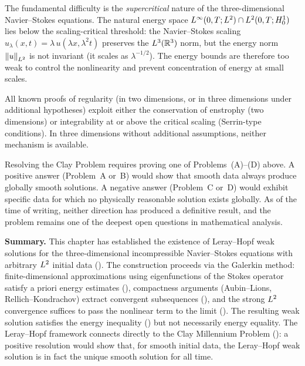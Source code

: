 \begin{remark}\label{rem:the-gap}
  The fundamental difficulty is the \emph{supercritical} nature of the three-dimensional
  Navier--Stokes equations.  The natural energy space
  $L^{\infty}(0, T; L^{2}) \cap L^{2}(0, T; H^{1}_0)$ lies below the
  scaling-critical threshold: the Navier--Stokes scaling
  $u_{\lambda}(x, t) = \lambda\,u(\lambda x, \lambda^{2} t)$ preserves the
  $L^{3}(\mathbb{R}^{3})$ norm, but the energy norm $\left\lVert u \right\rVert_{L^{2}}$ is not invariant
  (it scales as $\lambda^{-1/2}$).  The energy bounds are therefore too weak to control
  the nonlinearity and prevent concentration of energy at small scales.

  All known proofs of regularity (in two dimensions, or in three dimensions under
  additional hypotheses) exploit either the conservation of enstrophy (two dimensions) or
  integrability at or above the critical scaling (Serrin-type conditions).  In three
  dimensions without additional assumptions, neither mechanism is available.

  Resolving the Clay Problem requires proving one of Problems~(A)--(D) above.
  A positive answer (Problem~A or~B) would show that smooth data always produce globally
  smooth solutions.  A negative answer (Problem~C or~D) would exhibit specific data for
  which no physically reasonable solution exists globally.  As of the time of writing, neither direction has
  produced a definitive result, and the problem remains one of the deepest open questions
  in mathematical analysis.
\end{remark}

\bigskip

\noindent\textbf{Summary.}
This chapter has established the existence of Leray--Hopf weak solutions for the
three-dimensional incompressible Navier--Stokes equations with arbitrary $L^{2}$ initial
data ().  The construction proceeds via the Galerkin
method: finite-dimensional approximations using eigenfunctions of the Stokes operator
satisfy a priori energy estimates (), compactness arguments
(Aubin--Lions, Rellich--Kondrachov) extract convergent subsequences
(), and the strong $L^{2}$ convergence suffices to pass
the nonlinear term to the limit ().  The resulting weak solution
satisfies the energy inequality () but not necessarily energy
equality.  The Leray--Hopf framework connects directly to the Clay Millennium Problem
(): a positive resolution would show that, for smooth initial data, the
Leray--Hopf weak solution is in fact the unique smooth solution for all time.
